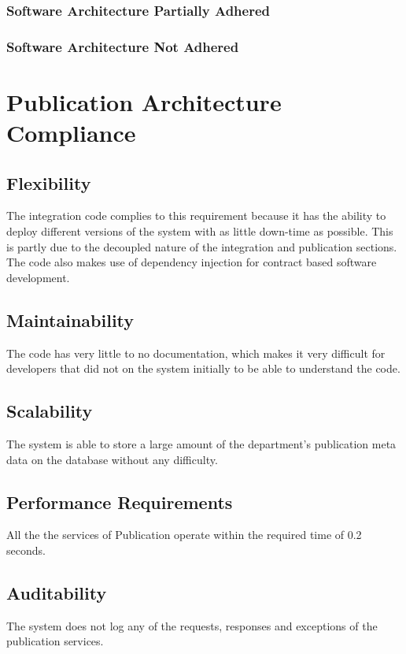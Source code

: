 \documentclass{article}
\begin{document}
        \subsubsection{Software Architecture Partially Adhered}
        \subsubsection{Software Architecture Not Adhered}       
        
\section{Publication Architecture Compliance}
    \subsection{Flexibility}
    The integration code complies to this requirement because it has the ability to deploy different versions of the system with as little down-time as possible. This is partly due to the decoupled nature of the integration and publication sections. The code also makes use of dependency injection for contract based software development.
    
    \subsection{Maintainability}
    The code has very little to no documentation, which makes it very difficult for developers that did not on the system initially to be able to understand the code.
    
    \subsection{Scalability}
    The system is able to store a large amount of the department's publication meta data on the database without any difficulty.
    
    \subsection{Performance Requirements}
    All the the services of Publication operate within the required time of 0.2 seconds.
    
    \subsection{Auditability}
    The system does not log any of the requests, responses and exceptions of the publication services.
    
\end{document}
